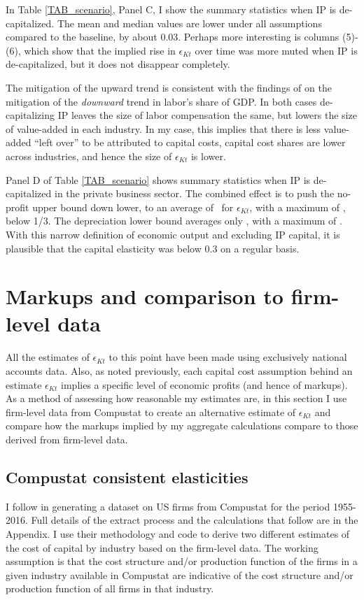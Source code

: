 \documentclass[11pt]{article}
\begin{document}
In Table \ref{TAB_scenario}, Panel C, I show the summary statistics when IP is de-capitalized. The mean and median values are lower under all assumptions compared to the baseline, by about 0.03. Perhaps more interesting is columns (5)-(6), which show that the implied rise in $\epsilon_{Kt}$ over time was more muted when IP is de-capitalized, but it does not disappear completely. 

The mitigation of the upward trend is consistent with the findings of \cite{ksz2020} on the mitigation of the \textit{downward} trend in labor's share of GDP. In both cases de-capitalizing IP leaves the size of labor compensation the same, but lowers the size of value-added in each industry. In my case, this implies that there is less value-added ``left over'' to be attributed to capital costs, capital cost shares are lower across industries, and hence the size of $\epsilon_{Kt}$ is lower. 

Panel D of Table \ref{TAB_scenario} shows summary statistics when IP is de-capitalized in the private business sector. The combined effect is to push the no-profit upper bound down lower, to an average of \exclnoprofit \ for $\epsilon_{Kt}$, with a maximum of \exclmaxnoprofit, below 1/3. The depreciation lower bound averages only \excldepr, with a maximum of \exclmaxdepr. With this narrow definition of economic output and excluding IP capital, it is plausible that the capital elasticity was below 0.3 on a regular basis.

\section{Markups and comparison to firm-level data}\label{SEC_compustat}
All the estimates of $\epsilon_{Kt}$ to this point have been made using exclusively national accounts data. Also, as noted previously, each capital cost assumption behind an estimate $\epsilon_{Kt}$ implies a specific level of economic profits (and hence of markups). As a method of assessing how reasonable my estimates are, in this section I use firm-level data from Compustat to create an alternative estimate of $\epsilon_{Kt}$ and compare how the markups implied by my aggregate calculations compare to those derived from firm-level data.

\subsection{Compustat consistent elasticities}
I follow \cite{dleu2020} in generating a dataset on US firms from Compustat for the period 1955-2016. Full details of the extract process and the calculations that follow are in the Appendix. I use their methodology and code to derive two different estimates of the cost of capital by industry based on the firm-level data. The working assumption is that the cost structure and/or production function of the firms in a given industry available in Compustat are indicative of the cost structure and/or production function of all firms in that industry. 
\end{document}
